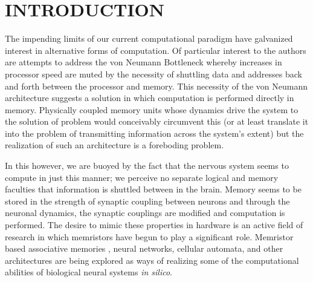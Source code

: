 \documentclass[aps,prl,preprint,groupedaddress]{revtex4-1}
\begin{document}

\section{INTRODUCTION}

The impending limits of our current computational paradigm have galvanized
interest in alternative forms of computation. Of particular interest to the
authors are attempts to address the von Neumann Bottleneck \cite{Backus1978}
whereby increases in processor speed are muted by the necessity of
shuttling data and addresses back and forth between the processor and memory.
This necessity of the von Neumann architecture suggests a solution in which
computation is performed directly in memory.  Physically coupled memory units
whose dynamics drive the system to the solution of problem
would conceivably circumvent this (or at least translate it into the
problem of transmitting information across the system's extent) but the
realization of such an architecture is a foreboding problem.

In this however, we are buoyed by the fact that the nervous system seems to
compute in just this manner; we perceive no separate logical and memory
faculties that information is shuttled between in the brain.  Memory seems
to be stored
in the strength of synaptic coupling between neurons and through the neuronal
dynamics, the synaptic couplings are modified and computation is performed.
The desire to mimic these properties in hardware is an active field of
research in which memristors have begun to play a significant role.  
Memristor based associative memories \cite{Pershin2010, Eryilmaz2014},
 neural networks, cellular automata,
and other architectures are being explored as ways of realizing some
of the computational abilities of biological neural systems
\textit{in silico}.
\end{document}
